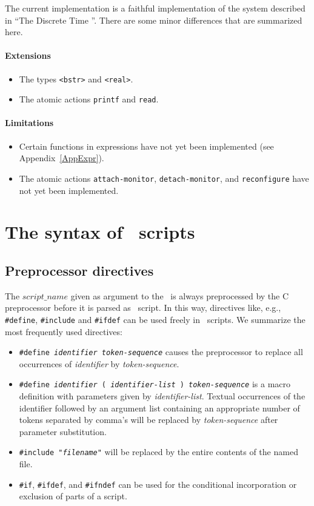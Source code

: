 \documentclass[twoside]{article} %
\begin{document}
The current implementation is a faithful implementation of the
system described in ``The Discrete Time \TB''. There are some
minor differences that are summarized here.

\paragraph{Extensions}
\begin{itemize}
\item The types {\tt <bstr>} and {\tt <real>}.
\item The atomic actions {\tt printf} and {\tt read}.
\end{itemize}

\paragraph{Limitations}
\begin{itemize}
\item Certain functions in expressions have not yet been implemented
(see Appendix~\ref{AppExpr}).

\item The atomic actions {\tt attach-monitor}, {\tt detach-monitor},
and {\tt reconfigure} have not yet been implemented.
\end{itemize}

\newpage
\section{The syntax of \T\ scripts}
\subsection{Preprocessor directives}

The $script\_name$ given as argument to the \TB\ is always
preprocessed by the C preprocessor before it is parsed as \T\ script.
In this way, directives like, e.g., {\tt \#define}, {\tt \#include} and
{\tt \#ifdef} can be used freely in \T\ scripts. We summarize the
most frequently used directives:
\begin{itemize}
\item {\tt \#define {\em identifier} {\em token-sequence}} causes
the preprocessor to replace all occurrences of {\em identifier}
by {\em token-sequence}.
\item {\tt \#define {\em identifier} ( {\em identifier-list} ) {\em token-sequence}} is
a macro definition with parameters given by {\em identifier-list}.
Textual occurrences of the identifier followed by an argument list
containing an appropriate number of tokens separated by comma's
will be replaced by {\em token-sequence} after parameter substitution.
\item {\tt \#include "{\em filename}"} will be replaced by the
entire contents of the named file.
\item {\tt \#if}, {\tt \#ifdef}, and {\tt \#ifndef} can be used for
the conditional incorporation or exclusion of parts of a script.
\end{itemize}
\end{document}

